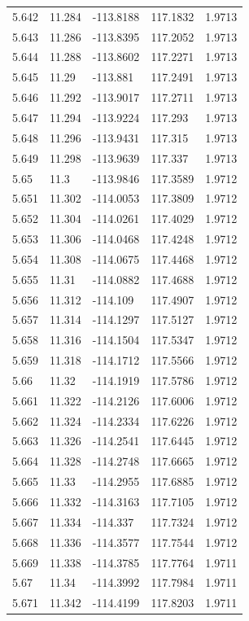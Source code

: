 \begin{tabular}{lllll}
5.642 & 11.284 & -113.8188 & 117.1832 & 1.9713 \\
5.643 & 11.286 & -113.8395 & 117.2052 & 1.9713 \\
5.644 & 11.288 & -113.8602 & 117.2271 & 1.9713 \\
5.645 & 11.29 & -113.881 & 117.2491 & 1.9713 \\
5.646 & 11.292 & -113.9017 & 117.2711 & 1.9713 \\
5.647 & 11.294 & -113.9224 & 117.293 & 1.9713 \\
5.648 & 11.296 & -113.9431 & 117.315 & 1.9713 \\
5.649 & 11.298 & -113.9639 & 117.337 & 1.9713 \\
5.65 & 11.3 & -113.9846 & 117.3589 & 1.9712 \\
5.651 & 11.302 & -114.0053 & 117.3809 & 1.9712 \\
5.652 & 11.304 & -114.0261 & 117.4029 & 1.9712 \\
5.653 & 11.306 & -114.0468 & 117.4248 & 1.9712 \\
5.654 & 11.308 & -114.0675 & 117.4468 & 1.9712 \\
5.655 & 11.31 & -114.0882 & 117.4688 & 1.9712 \\
5.656 & 11.312 & -114.109 & 117.4907 & 1.9712 \\
5.657 & 11.314 & -114.1297 & 117.5127 & 1.9712 \\
5.658 & 11.316 & -114.1504 & 117.5347 & 1.9712 \\
5.659 & 11.318 & -114.1712 & 117.5566 & 1.9712 \\
5.66 & 11.32 & -114.1919 & 117.5786 & 1.9712 \\
5.661 & 11.322 & -114.2126 & 117.6006 & 1.9712 \\
5.662 & 11.324 & -114.2334 & 117.6226 & 1.9712 \\
5.663 & 11.326 & -114.2541 & 117.6445 & 1.9712 \\
5.664 & 11.328 & -114.2748 & 117.6665 & 1.9712 \\
5.665 & 11.33 & -114.2955 & 117.6885 & 1.9712 \\
5.666 & 11.332 & -114.3163 & 117.7105 & 1.9712 \\
5.667 & 11.334 & -114.337 & 117.7324 & 1.9712 \\
5.668 & 11.336 & -114.3577 & 117.7544 & 1.9712 \\
5.669 & 11.338 & -114.3785 & 117.7764 & 1.9711 \\
5.67 & 11.34 & -114.3992 & 117.7984 & 1.9711 \\
5.671 & 11.342 & -114.4199 & 117.8203 & 1.9711 \\

\end{tabular}
